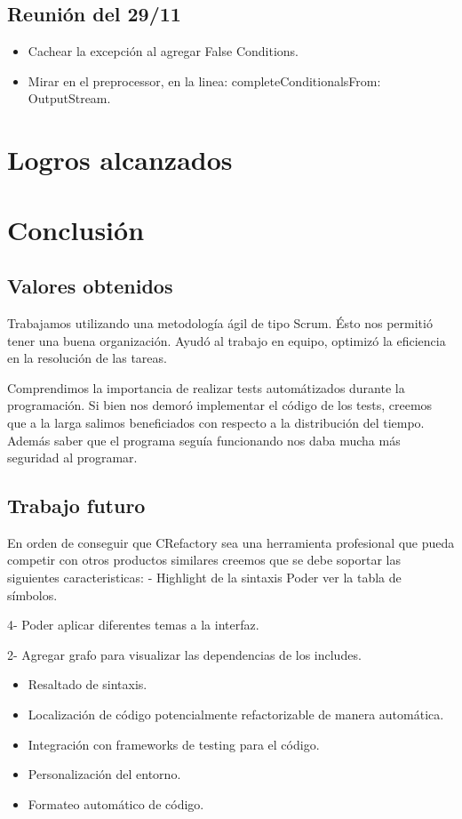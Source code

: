 \documentclass[a4paper,oneside,10pt]{article}
\begin{document}
\subsection{Reunión del 29/11}
\begin{itemize}
\item Cachear la excepción al agregar False Conditions. 
\item Mirar en el preprocessor, en la linea: completeConditionalsFrom: OutputStream.
\end{itemize}

\section{Logros alcanzados}

\section{Conclusi\'on}

\subsection{Valores obtenidos}
Trabajamos utilizando una metodología ágil de tipo Scrum. Ésto nos permitió tener una buena organización. Ayudó al trabajo en equipo, optimizó la eficiencia en la resolución de las tareas.

Comprendimos la importancia de realizar tests automátizados durante la programación. Si bien nos demoró implementar el código de los tests, creemos que a la larga salimos beneficiados con respecto a la distribución del tiempo. Además saber que el programa seguía funcionando nos daba mucha más seguridad al programar.

\subsection{Trabajo futuro}
En orden de conseguir que CRefactory sea una herramienta profesional que pueda competir con otros productos similares creemos que se debe soportar las siguientes caracteristicas:
- Highlight de la sintaxis
Poder ver la tabla de símbolos.

4- Poder aplicar diferentes temas a la interfaz.

2- Agregar grafo para visualizar las dependencias de los includes.
\begin{itemize}
	\item Resaltado de sintaxis.
	\item Localizaci\'on de c\'odigo potencialmente refactorizable de manera autom\'atica.
	\item Integraci\'on con frameworks de testing para el c\'odigo.
	\item Personalizaci\'on del entorno.
	\item Formateo autom\'atico de c\'odigo.
\end{itemize}
\end{document}

